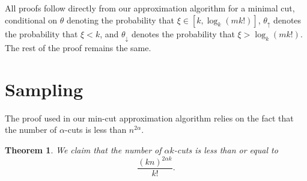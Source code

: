 \documentclass[12pt]{article}
\newtheorem{theorem}{Theorem}
\begin{document}
All proofs follow directly from our approximation algorithm for a minimal cut, conditional on $\theta$ denoting the probability that $\xi \in [k, \log_k(mk!)]$, $\theta_{\uparrow}$ denotes the probability that $\xi < k$, and $\theta_{\downarrow}$ denotes the probability that $\xi > \log_k(mk!)$. The rest of the proof remains the same.

\section{Sampling} The proof used in our min-cut approximation algorithm relies on the fact that the number of $\alpha$-cuts is less than $n^{2 \alpha}$. 

\begin{theorem}
We claim that the number of $\alpha k$-cuts is less than or equal to
\[
\frac{(kn)^{2 \alpha k}}{k!}.
\]
\end{theorem}
\end{document}
